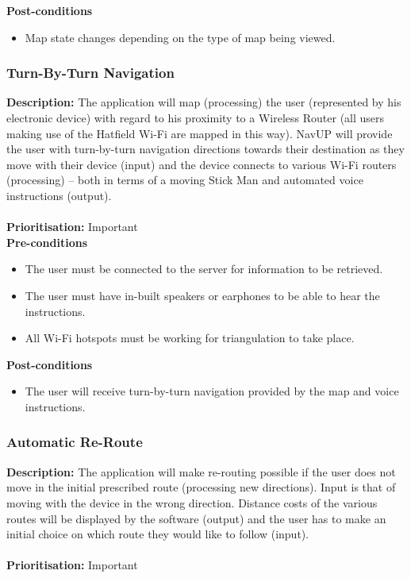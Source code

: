 \documentclass[runningheads,a4paper]{article}
\begin{document}
\textbf{Post-conditions}
\begin{itemize}
  	\item Map state changes depending on the type of map being viewed.
\end{itemize}

\subsubsection{Turn-By-Turn Navigation}

\textbf{Description:}  The application will map (processing) the user (represented by his electronic device) with regard to his proximity to a Wireless Router (all users making use of the Hatfield Wi-Fi are mapped in this way). NavUP will provide the user with turn-by-turn navigation directions towards their destination as they move with their device (input) and the device connects to various Wi-Fi routers (processing) – both in terms of a moving Stick Man and automated voice instructions (output).\\\\
\noindent
\textbf{Prioritisation:} Important\\
  
  
\textbf{Pre-conditions}
\begin{itemize}
	\item The user must be connected to the server for information to be retrieved.
	\item The user must have in-built speakers or earphones to be able to hear the instructions.
	\item All Wi-Fi hotspots must be working for triangulation to take place.
\end{itemize}
  
\textbf{Post-conditions}
\begin{itemize}
  	\item The user will receive turn-by-turn navigation provided by the map and voice instructions.
\end{itemize}

\subsubsection{Automatic Re-Route}

\textbf{Description:}  The application will make re-routing possible if the user does not move in the initial prescribed route (processing new directions). Input is that of moving with the device in the wrong direction. Distance costs of the various routes will be displayed by the software (output) and the user has to make an initial choice on which route they would like to follow (input).\\\\
\noindent
\textbf{Prioritisation:} Important\\
  
\end{document}
